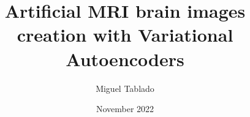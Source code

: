 \title{Artificial MRI brain images creation with Variational Autoencoders}

\author{Miguel Tablado}

\date{November 2022}
\maketitle